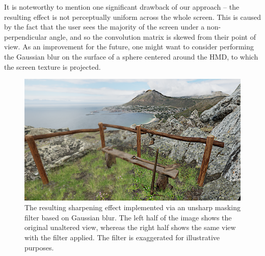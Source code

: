 It is noteworthy to mention one significant drawback of our approach -- the resulting effect is not perceptually uniform across the whole screen. This is caused by the fact that the user sees the majority of the screen under a non-perpendicular angle, and so the convolution matrix is skewed from their point of view. As an improvement for the future, one might want to consider performing the Gaussian blur on the surface of a sphere centered around the \ac{HMD}, to which the screen texture is projected.

\begin{figure}[H]
    \centering
    \ifgraphics
        \includegraphics[width=\textwidth]{img/simr-sharpening.png}
    \fi
    \caption{The resulting sharpening effect implemented via an unsharp masking filter based on Gaussian blur. The left half of the image shows the original unaltered view, whereas the right half shows the same view with the filter applied. The filter is exaggerated for illustrative purposes.}\label{fig:sharpening-demo}
\end{figure}

